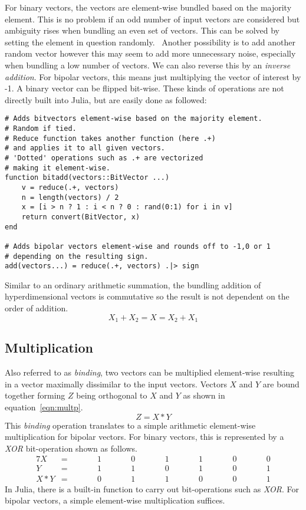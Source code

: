 For binary vectors, the vectors are element-wise bundled based on the majority element. This is no problem if an odd number of input vectors are considered but ambiguity rises when bundling an even set of vectors. This can be solved by setting the element in question randomly.~\cite{binBund} Another possibility is to add another random vector however this may seem to add more unnecessary noise, especially when bundling a low number of vectors. We can also reverse this by an \textit{inverse addition}. For bipolar vectors, this means just multiplying the vector of interest by -1. A binary vector can be flipped bit-wise. These kinds of operations are not directly built into Julia, but are easily done as followed:

\begin{verbatim}
# Adds bitvectors element-wise based on the majority element.
# Random if tied.
# Reduce function takes another function (here .+)
# and applies it to all given vectors.
# 'Dotted' operations such as .+ are vectorized
# making it element-wise.
function bitadd(vectors::BitVector ...)
    v = reduce(.+, vectors)            
    n = length(vectors) / 2
    x = [i > n ? 1 : i < n ? 0 : rand(0:1) for i in v]
    return convert(BitVector, x)
end

# Adds bipolar vectors element-wise and rounds off to -1,0 or 1
# depending on the resulting sign.
add(vectors...) = reduce(.+, vectors) .|> sign
\end{verbatim}
Similar to an ordinary arithmetic summation, the bundling addition of hyperdimensional vectors is commutative so the result is not dependent on the order of addition.
\begin{equation}
    \label{eqn:sumcom}
    X_{1} + X_{2} = X = X_{2} + X_{1}
\end{equation}
\subsection*{Multiplication} \label{sssec:mult}
Also referred to as \textit{binding}, two vectors can be multiplied element-wise resulting in a vector maximally dissimilar to the input vectors. Vectors $X$ and $Y$ are bound together forming $Z$ being orthogonal to $X$ and $Y$ as shown in equation~\ref{eqn:multp}.
\begin{equation}
    \label{eqn:multp}
    Z = X * Y
\end{equation}
This \textit{binding} operation translates to a simple arithmetic element-wise multiplication for bipolar vectors. For binary vectors, this is represented by a \textit{XOR} bit-operation shown as follows.
\begin{alignat*}{7}
    X &= && \qquad 1 && \qquad 0 && \qquad 1 && \qquad 1 && \qquad 0 && \qquad 0 \\
    Y &= && \qquad 1 && \qquad 1 && \qquad 0 && \qquad 1 && \qquad 0 && \qquad 1 \\
    \hline
    X * Y &= && \qquad 0 && \qquad 1 && \qquad 1 &&  \qquad 0 && \qquad 0 && \qquad 1
\end{alignat*}
In Julia, there is a built-in function to carry out bit-operations such as \textit{XOR}. For bipolar vectors, a simple element-wise multiplication suffices.

